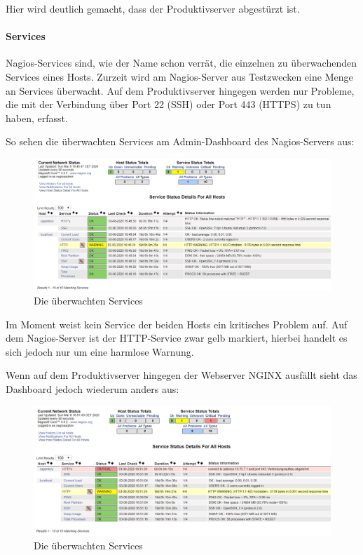 Hier wird deutlich gemacht, dass der Produktivserver abgestürzt ist.

\hypertarget{services}{%
\paragraph{Services}\label{services}}

Nagios-Services sind, wie der Name schon verrät, die einzelnen zu
überwachenden Services eines Hosts. Zurzeit wird am Nagios-Server aus
Testzwecken eine Menge an Services überwacht. Auf dem Produktivserver
hingegen werden nur Probleme, die mit der Verbindung über Port 22 (SSH)
oder Port 443 (HTTPS) zu tun haben, erfasst.

So sehen die überwachten Services am Admin-Dashboard des Nagios-Servers
aus:

\begin{figure}[ht]
\centering
\includegraphics{services.png}
\caption{Die überwachten Services}
\end{figure}

Im Moment weist kein Service der beiden Hosts ein kritisches Problem
auf. Auf dem Nagios-Server ist der HTTP-Service zwar gelb markiert,
hierbei handelt es sich jedoch nur um eine harmlose Warnung.

Wenn auf dem Produktivserver hingegen der Webserver NGINX ausfällt sieht
das Dashboard jedoch wiederum anders aus:

\begin{figure}[ht]
\centering
\includegraphics{dednginx.png}
\caption{Die überwachten Services}
\end{figure}

